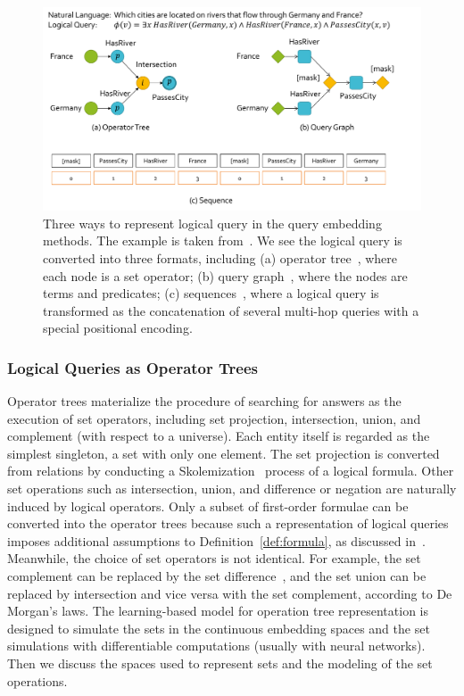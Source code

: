 \documentclass[11pt]{article}
\begin{document}
\begin{figure}[t]
\centering
    \includegraphics[width=\linewidth]{submissions/logical-queries-survey/fig/logical-query-repr.pdf}
    \caption{Three ways to represent logical query in the query embedding methods. The example is taken from~\cite{Kotnis2021AnsweringComplex}. We see the logical query is converted into three formats, including (a) operator tree~\cite{Wang2021BenchmarkingCombinatorial}, where each node is a set operator; (b) query graph~\cite{Liu2022MaskReason}, where the nodes are terms and predicates; (c) sequences~\cite{Kotnis2021AnsweringComplex}, where a logical query is transformed as the concatenation of several multi-hop queries with a special positional encoding.}\label{fig:query-representation}
\end{figure}

\subsubsection{Logical Queries as Operator Trees}\label{sec:qe-optree}
Operator trees materialize the procedure of searching for answers as the execution of set operators, including set projection, intersection, union, and complement (with respect to a universe).
Each entity itself is regarded as the simplest singleton, a set with only one element.
The set projection is converted from relations by conducting a Skolemization~\cite{Marker2002Modeltheory} process of a logical formula.
Other set operations such as intersection, union, and difference or negation are naturally induced by logical operators.
Only a subset of first-order formulae can be converted into the operator trees because such a representation of logical queries imposes additional assumptions to Definition~\ref{def:formula}, as discussed in~\cite{Wang2021BenchmarkingCombinatorial}.
Meanwhile, the choice of set operators is not identical. For example, the set complement can be replaced by the set difference~\cite{Liu2021NeuralAnsweringLogical}, and the set union can be replaced by intersection and vice versa with the set complement, according to De Morgan's laws.
The learning-based model for operation tree representation is designed to simulate the sets in the continuous embedding spaces and the set simulations with differentiable computations (usually with neural networks). Then we discuss the spaces used to represent sets and the modeling of the set operations.
\end{document}
